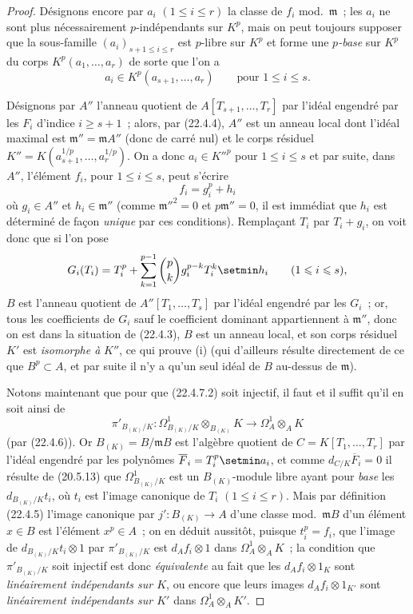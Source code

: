 \begin{proof}
Désignons encore par $a_i$ $(1\leqslant i\leqslant r)$ la classe de $f_i$
mod.~$\mathfrak m$~; les $a_i$ ne sont plus nécessairement $p$-indépendants
sur $K^p$, mais on peut toujours supposer que la sous-famille
$(a_i)_{s+1\leqslant i\leqslant r}$ est $p$-libre sur $K^p$ et forme une
\emph{$p$-base} sur $K^p$ du corps $K^p(a_1,\ldots,a_r)$ de sorte que l'on a
\[
  a_i\in K^p(a_{s+1},\ldots,a_r)\qquad\text{pour }1\leqslant i\leqslant s.
\]

Désignons par $A''$ l'anneau quotient de $A[T_{s+1},\ldots,T_r]$ par l'idéal
engendré par les $F_i$ d'indice $i\geqslant s+1$~; alors, par (22.4.4), $A''$
est un anneau local dont l'idéal maximal est $\mathfrak m''=\mathfrak mA''$
(donc de carré nul) et le corps résiduel
$K''=K(a_{s+1}^{1/p},\ldots,a_r^{1/p})$. On a donc
$a_i\in K''^p$ pour $1\leqslant i\leqslant s$ et par suite, dans $A''$,
l'élément $f_i$, pour $1\leqslant i\leqslant s$, peut s'écrire
\begin{equation}
\label{0.22.4.7.3-fr}
  f_i=g_i^p+h_i
  \tag{22.4.7.3}
\end{equation}
où $g_i\in A''$ et $h_i\in\mathfrak m''$ (comme $\mathfrak m''^2=0$ et
$p\mathfrak m''=0$, il est immédiat que $h_i$ est déterminé de façon
\emph{unique} par ces conditions). Remplaçant $T_i$ par $T_i+g_i$, on voit donc
que si l'on pose
\[
  G_i(T_i)=T_i^p+\sum_{k=1}^{p-1}\binom pk g_i^{p-k}T_i^k\setmin h_i
  \qquad(1\leqslant i\leqslant s),
\]
$B$ est l'anneau quotient de $A''[T_1,\ldots,T_s]$ par l'idéal engendré par les
$G_i$~; or, tous les coefficients de $G_i$ sauf le coefficient dominant
appartiennent à $\mathfrak m''$, donc on est dans la situation de (22.4.3),
$B$ est un anneau local, et son corps résiduel $K'$ est \emph{isomorphe à}
$K''$, ce qui prouve (i) (qui d'ailleurs résulte directement de ce que
$B^p\subset A$, et par suite il n'y a qu'un seul idéal de $B$ au-dessus de
$\mathfrak m$).

Notons maintenant que pour que (22.4.7.2) soit injectif, il faut et il suffit
qu'il en soit ainsi de
\[
  \pi'_{B_{(K)}/K}:\Omega^1_{B_{(K)}/K}\otimes_{B_{(K)}}K
  \longrightarrow\Omega^1_A\otimes_AK
\]
(par (22.4.6)). Or $B_{(K)}=B/\mathfrak mB$ est l'algèbre quotient de
$C=K[T_1,\ldots,T_r]$ par l'idéal engendré par les polynômes
$\overline F_i=T_i^p\setmin a_i$, et comme $d_{C/K}\overline F_i=0$ il résulte de
(20.5.13) que $\Omega^1_{B_{(K)}/K}$ est un $B_{(K)}$-module libre ayant pour
\emph{base} les $d_{B_{(K)}/K}t_i$, où $t_i$ est l'image canonique de $T_i$
$(1\leqslant i\leqslant r)$. Mais par définition (22.4.5) l'image canonique par
$j':B_{(K)}\longrightarrow A$ d'une classe mod.~$\mathfrak mB$ d'un élément
$x\in B$ est l'élément $x^p\in A$~; on en déduit aussitôt, puisque $t_i^p=f_i$,
que l'image de $d_{B_{(K)}/K}t_i\otimes1$ par $\pi'_{B_{(K)}/K}$ est
$d_Af_i\otimes1$ dans $\Omega^1_A\otimes_AK$~; la condition que
$\pi'_{B_{(K)}/K}$ soit injectif est donc \emph{équivalente} au fait que les
$d_Af_i\otimes1_K$ sont \emph{linéairement indépendants sur $K$}, ou encore
que leurs images $d_Af_i\otimes1_{K'}$ sont \emph{linéairement indépendants
sur $K'$} dans $\Omega^1_A\otimes_AK'$.


\end{proof}
